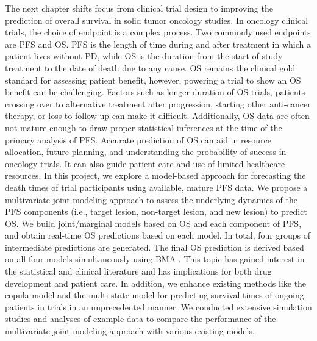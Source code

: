 The next chapter shifts focus from clinical trial design to improving the prediction of overall survival in solid tumor oncology studies. In oncology clinical trials, the choice of endpoint is a complex process. Two commonly used endpoints are \ac{PFS} and \ac{OS}. \ac{PFS} is the length of time during and after treatment in which a patient lives without \ac{PD}, while \ac{OS} is the duration from the start of study treatment to the date of death due to any cause. \ac{OS} remains the clinical gold standard for assessing patient benefit, however, powering a trial to show an \ac{OS} benefit can be challenging. Factors such as longer duration of \ac{OS} trials, patients crossing over to alternative treatment after progression, starting other anti-cancer therapy, or loss to follow-up can make it difficult. Additionally, \ac{OS} data are often not mature enough to draw proper statistical inferences at the time of the primary analysis of \ac{PFS}. Accurate prediction of \ac{OS} can aid in resource allocation, future planning, and understanding the probability of success in oncology trials. It can also guide patient care and use of limited healthcare resources. In this project, we explore a model-based approach for forecasting the death times of trial participants using available, mature \ac{PFS} data. We propose a multivariate joint modeling approach to assess the underlying dynamics of the \ac{PFS} components (i.e., target lesion, non-target lesion, and new lesion) to predict \ac{OS}. We build joint/marginal models based on \ac{OS} and each component of \ac{PFS}, and obtain real-time \ac{OS} predictions based on each model. In total, four groups of intermediate predictions are generated. The final \ac{OS} prediction is derived based on all four models simultaneously using \ac{BMA} \citep{hoeting1999bayesian}. This topic has gained interest in the statistical and clinical literature and has implications for both drug development and patient care. In addition, we enhance existing methods like the copula model and the multi-state model for predicting survival times of ongoing patients in trials in an unprecedented manner. We conducted extensive simulation studies and analyses of example data to compare the performance of the multivariate joint modeling approach with various existing models.


